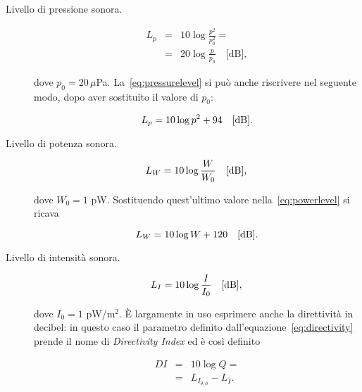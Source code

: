 \begin{description}
  \item[Livello di pressione sonora.]

       \begin{eqnarray}
	 \label{eq:pressurelevel}
          L_p & = & 10 \log \frac{p^2}{p_0^2} = \nonumber \\
              & = & 20 \log \frac{p}{p_0} \quad \textrm{[dB]},
       \end{eqnarray}

       dove $p_0 = 20 \, \mu$Pa. La~\ref{eq:pressurelevel} si pu\`o anche riscrivere nel seguente modo,
       dopo aver sostituito il valore di $p_0$:

       \begin{equation}
	 \label{eq:pressurelevel2}
	 L_p = 10 \log p^2 + 94 \quad \textrm{[dB]}.\\
       \end{equation}

  \item[Livello di potenza sonora.]

       \begin{equation}
	 \label{eq:powerlevel}
          L_W = 10 \log \frac{W}{W_0} \quad \textrm{[dB]},\\
       \end{equation}

       dove $W_0 = 1$ pW. Sostituendo quest'ultimo valore nella~\ref{eq:powerlevel} si ricava

      \begin{equation}
	 \label{eq:powerlevel2}
          L_W = 10 \log W + 120 \quad \textrm{[dB]}.\\
       \end{equation}

  \item[Livello di intensit\`a sonora.]
  
     \begin{equation}
	 \label{eq:intensitylevel}
          L_I = 10 \log \frac{I}{I_0} \quad \textrm{[dB]},\\
       \end{equation}

      dove $I_0 = 1$ pW/m$^2$.  \`E largamente in uso esprimere anche la direttivit\`a in decibel: in questo
      caso il parametro definito dall'equazione~\ref{eq:directivity} prende il nome di 
      \emph{Directivity Index} ed \`e cos\`i definito

      \begin{eqnarray}
	\label{eq:dirindex}
        \textit{DI} & = & 10 \log Q  = \nonumber \\
	            & = & L_{I_{\theta, \phi}} - L_{\overline{I}}.
       \end{eqnarray}

\end{description}

